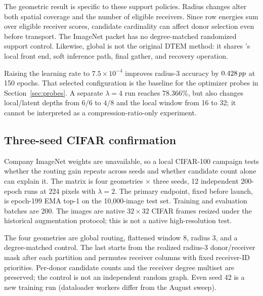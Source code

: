 \begin{table}[t]
\centering\small

\caption{224-pixel, 150-epoch routing controls. The first four rows use the
same learning rate and base architecture. The last row is the selected
higher-rate configuration later used for 300-epoch training. All accuracies
are single-seed EMA top-1.}
\label{tab:geometry}
\end{table}

The geometric result is specific to these support policies. Radius changes
alter both spatial coverage and the number of eligible receivers. Since row
energies sum over eligible receiver scores, candidate cardinality can affect
donor selection even before transport. The ImageNet packet has no
degree-matched randomized support control. Likewise, global \mn{} is not the
original DTEM method: it shares \mn{}'s local front end, soft inference path,
final gather, and recovery operation.

Raising the learning rate to $7.5\times10^{-4}$ improves radius-3 accuracy by
$0.428\,pp$ at 150 epochs. That selected configuration is the baseline for the
optimizer probes in Section~\ref{sec:probes}. A separate $\lambda=4$ run
reaches 78.366\%, but also changes local/latent depths from $6/6$ to $4/8$
and the local window from 16 to 32; it cannot be interpreted as a
compression-ratio-only experiment.

\subsection{Three-seed CIFAR confirmation}
\label{sec:cifar-seeds}

Company ImageNet weights are unavailable, so a local CIFAR-100 campaign tests
whether the routing gain repeats across seeds and whether candidate count
alone can explain it. The matrix is four geometries $\times$ three seeds,
12 independent 200-epoch runs at 224 pixels with $\lambda=2$. The primary
endpoint, fixed before launch, is epoch-199 EMA top-1 on the 10,000-image test
set. Training and evaluation batches are 200. The images are native
$32\times32$ CIFAR frames resized under the historical augmentation protocol;
this is not a native high-resolution test.

The four geometries are global routing, flattened window 8, radius 3, and a
degree-matched control. The last starts from the realized radius-3
donor/receiver mask after each partition and permutes receiver columns with
fixed receiver-ID priorities. Per-donor candidate counts and the receiver
degree multiset are preserved; the control is not an independent random
graph. Even seed 42 is a new training run (dataloader workers differ from the
August sweep).

